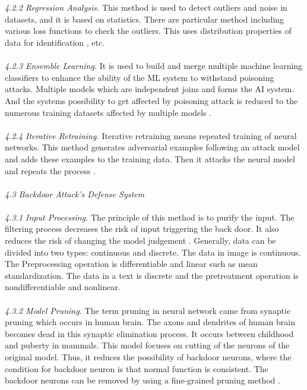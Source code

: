 \documentclass{article}
\begin{document}
	\\\\
	\textit{4.2.2 Regression Analysis.}
	This method is used to detect outliers and noise in datasets, and it is based on statistics. There are particular method including various loss functions to check the outliers. This uses distribution properties of data for identification \cite{jagielski2018manipulating}, etc. 
	\\\\
	\textit{4.2.3 Ensemble Learning.}
	It is used to build and merge multiple machine learning classifiers to enhance the ability of the ML system to withstand poisoning attacks. Multiple models which are independent joins and forms the AI system. And the systems possibility to get affected by poisoning attack is reduced to the numerous training datasets affected by multiple models \cite{li2020adversarial}.
	\\\\
	\textit{4.2.4 Iterative Retraining.}
	Iterative retraining means repeated training of neural networks. This method generates adversarial examples following an attack model and adds these examples to the training data. Then it attacks the neural model and repeats the process \cite{kim2021zero}.
	\\\\
	\textit{4.3 Backdoor Attack’s Defense System}
	\\\\
	\textit{4.3.1 Input Processing.}
	The principle of this method is to purify the input. The filtering process decreases the risk of input triggering the back door. It also reduces the risk of changing the model judgement \cite{liu2017neural}. Generally, data can be divided into two types: continuous and discrete. The data in image is continuous. The Preprocessing operation is differentiable and linear such as mean standardization. The data in a text is discrete and the pretreatment operation is nondifferentiable and nonlinear.
	\\\\
	\textit{4.3.2 Model Pruning.}
	The term pruning in neural network came from synaptic pruning which occurs in human brain. The axons and dendrites of human brain becomes dead in this synaptic elimination process. It occurs between childhood and puberty in mammals. This model focuses on cutting of the neurons of the original model. Thus, it reduces the possibility of backdoor neurons, where the condition for backdoor neuron is that normal function is consistent. The backdoor neurons can be removed by using a fine-grained pruning method \cite{liu2018fine}.
	
	
	
	
	
\end{document}
